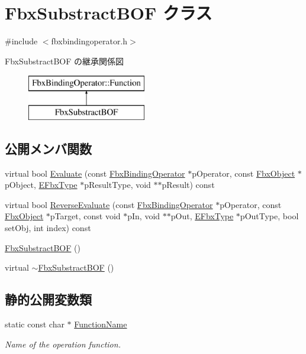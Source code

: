 \hypertarget{class_fbx_substract_b_o_f}{}\section{Fbx\+Substract\+B\+OF クラス}
\label{class_fbx_substract_b_o_f}


{\ttfamily \#include $<$fbxbindingoperator.\+h$>$}

Fbx\+Substract\+B\+OF の継承関係図\begin{figure}[H]
\begin{center}
\leavevmode
\includegraphics[height=2.000000cm]{class_fbx_substract_b_o_f}
\end{center}
\end{figure}
\subsection*{公開メンバ関数}
\begin{DoxyCompactItemize}
\item 
virtual bool \hyperlink{class_fbx_substract_b_o_f_a2c01671e4d9c6664557536e2bd748a3b}{Evaluate} (const \hyperlink{class_fbx_binding_operator}{Fbx\+Binding\+Operator} $\ast$p\+Operator, const \hyperlink{class_fbx_object}{Fbx\+Object} $\ast$p\+Object, \hyperlink{fbxpropertytypes_8h_a73913a5ddfb20e57c6f25e9e6784bd92}{E\+Fbx\+Type} $\ast$p\+Result\+Type, void $\ast$$\ast$p\+Result) const
\item 
virtual bool \hyperlink{class_fbx_substract_b_o_f_a86004768a640d77ca9d7d937c4a91d2c}{Reverse\+Evaluate} (const \hyperlink{class_fbx_binding_operator}{Fbx\+Binding\+Operator} $\ast$p\+Operator, const \hyperlink{class_fbx_object}{Fbx\+Object} $\ast$p\+Target, const void $\ast$p\+In, void $\ast$$\ast$p\+Out, \hyperlink{fbxpropertytypes_8h_a73913a5ddfb20e57c6f25e9e6784bd92}{E\+Fbx\+Type} $\ast$p\+Out\+Type, bool set\+Obj, int index) const
\item 
\hyperlink{class_fbx_substract_b_o_f_a29ce4c8319a19a5058556679c86ce0c7}{Fbx\+Substract\+B\+OF} ()
\item 
virtual \hyperlink{class_fbx_substract_b_o_f_a13b785a1c93398609cfde76fbde7d0b4}{$\sim$\+Fbx\+Substract\+B\+OF} ()
\end{DoxyCompactItemize}
\subsection*{静的公開変数類}
\begin{DoxyCompactItemize}
\item 
static const char $\ast$ \hyperlink{class_fbx_substract_b_o_f_a9fc179455ff9204e58db8670b51c44b2}{Function\+Name}
\begin{DoxyCompactList}\small\item\em Name of the operation function. \end{DoxyCompactList}\end{DoxyCompactItemize}


